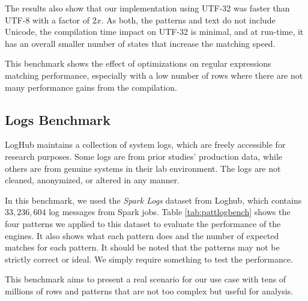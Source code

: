 The results also show that our implementation using UTF-32 was faster than UTF-8 with a factor of $2x$. As both, the patterns and text do not include Unicode, the compilation time impact on UTF-32 is minimal, and at run-time, it has an overall smaller number of states that increase the matching speed.

This benchmark shows the effect of optimizations on regular expressions matching performance, especially with a low number of rows where there are not many performance gains from the compilation.

\subsection{Logs Benchmark}

LogHub \cite{loghub} maintains a collection of system logs, which are freely accessible for research purposes. Some logs are from prior studies' production data, while others are from genuine systems in their lab environment. The logs are not cleaned, anonymized, or altered in any manner.

In this benchmark, we used the \textit{Spark Logs} dataset from Loghub, which contains $33,236,604$ log messages from Spark jobs. Table \ref{tab:pattlogbench} shows the four patterns we applied to this dataset to evaluate the performance of the engines. It also shows what each pattern does and the number of expected matches for each pattern. It should be noted that the patterns may not be strictly correct or ideal. We simply require something to test the performance.

This benchmark aims to present a real scenario for our use case with tens of millions of rows and patterns that are not too complex but useful for analysis.

